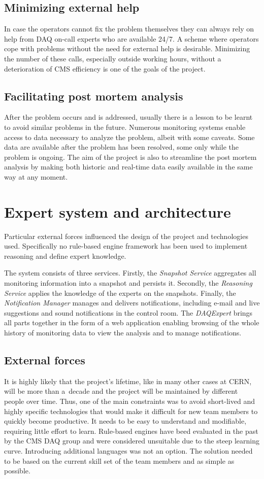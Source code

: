 \documentclass[a4paper]{jpconf}
\begin{document}
\subsection{Minimizing external help}
In case the operators cannot fix the problem themselves they can always rely on help from DAQ on-call experts who are available 24/7. A scheme where operators cope with problems without the need for external help is desirable. Minimizing the number of these calls, especially outside working hours, without a deterioration of CMS efficiency is one of the goals of the project.


\subsection{Facilitating post mortem analysis}
After the problem occurs and is addressed, usually there is a lesson to be learnt to avoid similar problems in the future. Numerous monitoring systems enable access to data necessary to analyze the problem, albeit with some caveats. Some data are available after the problem has been resolved, some only while the problem is ongoing. The aim of the project is also to streamline the post mortem analysis by making both historic and real-time data easily available in the same way at any moment.

\section{Expert system and architecture}
Particular external forces influenced the design of the project and technologies used. Specifically no rule-based engine framework has been used to implement reasoning and define expert knowledge.

The system consists of three services. Firstly, the {\it Snapshot Service} aggregates all monitoring information into a snapshot and persists it. Secondly, the { \it Reasoning Service} applies the knowledge of the experts on the snapshots. Finally, the { \it Notification Manager } manages and delivers notifications, including e-mail and live suggestions and sound notifications in the control room. The { \it DAQExpert } brings all parts together in the form of a web application enabling browsing of the whole history of monitoring data to view the analysis and to manage notifications.

\subsection{External forces}
It is highly likely that the project's lifetime, like in many other cases at CERN, will be more than a~decade and the project will be maintained by different people over time. Thus, one of the main constraints was to avoid short-lived and highly specific technologies that would make it difficult for new team members to quickly become productive. It needs to be easy to understand and modifiable, requiring little effort to learn. Rule-based engines have beed evaluated in the past by the CMS DAQ group and were considered unsuitable due to the steep learning curve. Introducing additional languages was not an option. The solution needed to be based on the current skill set of the team members and as simple as possible.
\end{document}
